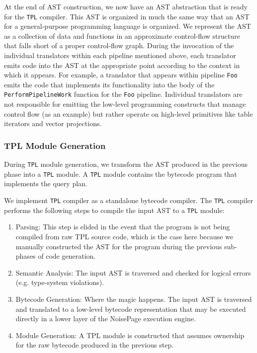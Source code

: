 \documentclass{vldb}
\newcommand{\tpl}{\texttt{TPL}\xspace}
\begin{document}
At the end of AST construction, we now have an AST abstraction that is ready for the \tpl compiler. This AST is organized in much the same way that an AST for a general-purpose programming language is organized. We represent the AST as a collection of data and functions in an approximate control-flow structure that falls short of a proper control-flow graph. During the invocation of the individual translators within each pipeline mentioned above, each translator emits code into the AST at the appropriate point according to the context in which it appears. For example, a translator that appears within pipeline \texttt{Foo} emits the code that implements its functionality into the body of the \texttt{PerformPipelineWork} function for the \texttt{Foo} pipeline. Individual translators are not responsible for emitting the low-level programming constructs that manage control flow (as an example) but rather operate on high-level primitives like table iterators and vector projections.

\subsubsection{TPL Module Generation} 

During \tpl module generation, we transform the AST produced in the previous phase into a \tpl module. A \tpl module contains the bytecode program that implements the query plan.

We implement \tpl compiler as a standalone bytecode compiler. The \tpl compiler performs the following steps to compile the input AST to a \tpl module:

\begin{enumerate}
    \item Parsing: This step is elided in the event that the program is not being compiled from raw TPL source code, which is the case here because we manually constructed the AST for the program during the previous sub-phases of code generation.
    \item Semantic Analysis: The input AST is traversed and checked for logical errors (e.g. type-system violations).
    \item Bytecode Generation: Where the magic happens. The input AST is traversed and translated to a low-level bytecode representation that may be executed directly in a lower layer of the NoisePage execution engine.
    \item Module Generation: A TPL module is constructed that assumes ownership for the raw bytecode produced in the previous step.
\end{enumerate}
\end{document}
